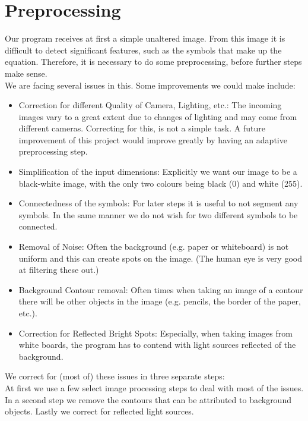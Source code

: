 \documentclass[12pt]{article}
\begin{document}
\section{Preprocessing}
	Our program receives at first a simple unaltered image.
	From this image it is difficult to detect significant features, such as the symbols that make up the equation.
	Therefore, it is necessary to do some preprocessing, before further steps make sense.\\
	We are facing several issues in this.
	Some improvements we could make include:\\
	\begin{itemize}
		\item Correction for different Quality of Camera, Lighting, etc.:
		The incoming images vary to a great extent due to changes of lighting and may come from different cameras.
		Correcting for this, is not a simple task.
		A future improvement of this project would improve greatly by having an adaptive preprocessing step.
		\item Simplification of the input dimensions: Explicitly we want our image to be a black-white image, with the only two colours being black (0) and white (255).
		\item Connectedness of the symbols: For later steps it is useful to not segment any symbols. In the same manner we do not wish for two different symbols to be connected.
		\item Removal of Noise: Often the background (e.g. paper or whiteboard) is not uniform and this can create spots on the image. (The human eye is very good at filtering these out.)
		\item Background Contour removal: Often times when taking an image of a contour there will be other objects in the image (e.g. pencils, the border of the paper, etc.).
		\item Correction for Reflected Bright Spots: Especially, when taking images from white boards, the program has to contend with light sources reflected of the background.
	\end{itemize}
		We correct for (most of) these issues in three separate steps:\\
		At first we use a few select image processing steps to deal with most of the issues.\\
		In a second step we remove the contours that can be attributed to background objects.
		Lastly we correct for reflected light sources. %
\end{document}
